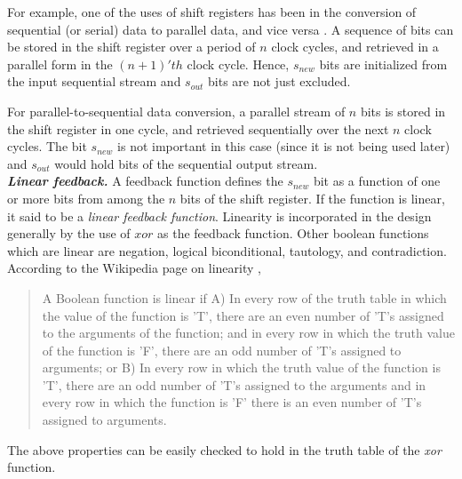 For example, one of the uses of shift registers has been in the conversion of sequential (or serial) data to parallel data, and vice versa \cite{lfsr-link}. A sequence of bits can be stored in the shift register over a period of $n$ clock cycles, and retrieved in a parallel form in the $(n+1)'th$ clock cycle. Hence, $s_{new}$ bits are initialized from the input sequential stream and $s_{out}$ bits are not just excluded. 

For parallel-to-sequential data conversion, a parallel stream of $n$ bits is stored in the shift register in one cycle, and retrieved sequentially over the next $n$ clock cycles. The bit $s_{new}$ is not important in this case (since it is not being used later) and $s_{out}$ would hold bits of the sequential output stream.\\


\textbf{\emph{Linear feedback.}} A feedback function defines the $s_{new}$ bit as a function of one or more bits from among the $n$ bits of the shift register. If the function is linear, it said to be a \emph{linear feedback function}. Linearity is incorporated in the design generally by the use of $xor$ as the feedback function. Other boolean functions which are linear are negation, logical biconditional, tautology, and contradiction. According to the Wikipedia page on linearity \cite{linear-wiki}, 
\begin{quote}
A Boolean function is linear if A) In every row of the truth table in which the value of the function is 'T', there are an even number of 'T's assigned to the arguments of the function; and in every row in which the truth value of the function is 'F', there are an odd number of 'T's assigned to arguments; or B) In every row in which the truth value of the function is 'T', there are an odd number of 'T's assigned to the arguments and in every row in which the function is 'F' there is an even number of 'T's assigned to arguments.
\end{quote}

The above properties can be easily checked to hold in the truth table of the \emph{xor} function.

%


